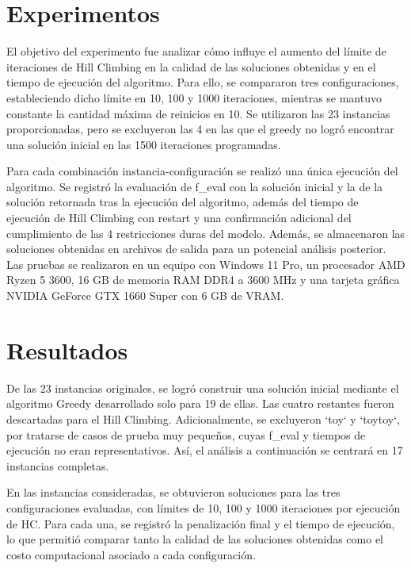 \documentclass[letter, 10pt]{article}
\begin{document}
\section{Experimentos}
El objetivo del experimento fue analizar c\'omo influye el aumento del l\'imite de iteraciones de Hill Climbing en la calidad de las soluciones obtenidas y en el tiempo de ejecuci\'on del algoritmo. Para ello, se compararon tres configuraciones, estableciendo dicho l\'imite en 10, 100 y 1000 iteraciones, mientras se mantuvo constante la cantidad m\'axima de reinicios en 10. Se utilizaron las 23 instancias proporcionadas, pero se excluyeron las 4 en las que el greedy no logr\'o encontrar una soluci\'on inicial en las 1500 iteraciones programadas.

Para cada combinaci\'on instancia-configuraci\'on se realiz\'o una \'unica ejecuci\'on del algoritmo. Se registr\'o la evaluaci\'on de f\_eval con la soluci\'on inicial y la de la soluci\'on retornada tras la ejecuci\'on del algoritmo, adem\'as del tiempo de ejecuci\'on de Hill Climbing con restart y una confirmaci\'on adicional del cumplimiento de las 4 restricciones duras del modelo. Adem\'as, se almacenaron las soluciones obtenidas en archivos de salida para un potencial an\'alisis posterior. Las pruebas se realizaron en un equipo con Windows 11 Pro, un procesador AMD Ryzen 5 3600, 16 GB de memoria RAM DDR4 a 3600 MHz y una tarjeta gr\'afica NVIDIA GeForce GTX 1660 Super con 6 GB de VRAM.
\section{Resultados}
De las 23 instancias originales, se logr\'o construir una soluci\'on inicial mediante el algoritmo Greedy desarrollado solo para 19 de ellas. Las cuatro restantes fueron descartadas para el Hill Climbing. Adicionalmente, se excluyeron `toy` y `toytoy`, por tratarse de casos de prueba muy peque\~nos, cuyas f\_eval y tiempos de ejecuci\'on no eran representativos. As\'i, el an\'alisis a continuaci\'on se centrar\'a en 17 instancias completas.

En las instancias consideradas, se obtuvieron soluciones para las tres configuraciones evaluadas, con l\'imites de 10, 100 y 1000 iteraciones por ejecuci\'on de HC. Para cada una, se registr\'o la penalizaci\'on final y el tiempo de ejecuci\'on, lo que permiti\'o comparar tanto la calidad de las soluciones obtenidas como el costo computacional asociado a cada configuraci\'on.
\end{document}
